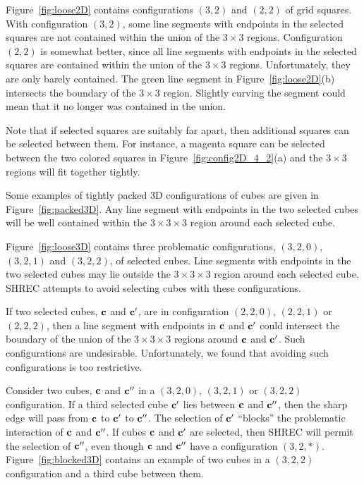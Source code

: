 Figure~\ref{fig:loose2D} contains configurations $(3,2)$ and $(2,2)$
of grid squares.
With configuration $(3,2)$, some line segments with endpoints
in the selected squares are not contained within the union
of the $3 \times 3$ regions.
Configuration $(2,2)$ is somewhat better,
since all line segments with endpoints in the selected squares
are contained within the union of the $3 \times 3$ regions.
Unfortunately, they are only barely contained.
The green line segment in Figure~\ref{fig:loose2D}(b) intersects
the boundary of the $3 \times 3$ region.
Slightly curving the segment could mean that it no longer was contained
in the union.

Note that if selected squares are suitably far apart,
then additional squares can be selected between them.
For instance, a magenta square can be selected between the two colored squares
in Figure~\ref{fig:config2D_4_2}(a) and the $3 \times 3$ regions
will fit together tightly.

Some examples of tightly packed 3D configurations of cubes are given
in Figure~\ref{fig:packed3D}.
Any line segment with endpoints in the two selected cubes
will be well contained within the $3 \times 3 \times 3$ region 
around each selected cube.

Figure~\ref{fig:loose3D} contains three problematic configurations,
$(3,2,0)$, $(3,2,1)$ and $(3,2,2)$,
of  selected cubes.
Line segments with endpoints in the two selected cubes
may lie outside the $3 \times 3 \times 3$ region around each selected cube.
SHREC attempts to avoid selecting cubes with these configurations.

If two selected cubes, $\mathbf{c}$ and $\mathbf{c}'$, 
are in configuration $(2,2,0)$, $(2,2,1)$ or $(2,2,2)$,
then a line segment with endpoints in $\mathbf{c}$ and $\mathbf{c}'$
could intersect the boundary of the union of the $3 \times 3 \times 3$
regions around $\mathbf{c}$ and $\mathbf{c}'$.
Such configurations are undesirable.
Unfortunately, we found that avoiding such configurations is too restrictive.

Consider two cubes, $\mathbf{c}$ and $\mathbf{c}''$ 
in a $(3,2,0)$, $(3,2,1)$ or $(3,2,2)$ configuration.
If a third selected cube $\mathbf{c}'$ lies between $\mathbf{c}$ and $\mathbf{c}''$,
then the sharp edge will pass from $\mathbf{c}$ to $\mathbf{c}'$ to $\mathbf{c}''$.
The selection of $\mathbf{c}'$ ``blocks'' the problematic interaction 
of $\mathbf{c}$ and $\mathbf{c}''$.
If cubes $\mathbf{c}$ and $\mathbf{c}'$ are selected,
then SHREC will permit the selection of $\mathbf{c}''$,
even though $\mathbf{c}$ and $\mathbf{c}''$ have a configuration $(3,2,*)$.
Figure~\ref{fig:blocked3D} contains an example of two cubes 
in a $(3,2,2)$ configuration and a third cube between them.

